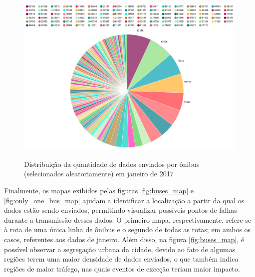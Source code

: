 \documentclass[
	12pt,				%
	oneside,			%
	a4paper,			%
	english,			%
	brazil				%
	]{abntex2ppgsi}
\begin{document}
\begin{figure}[!htb]%
	\centering
 	  \caption{Distribuição da quantidade de dados enviados por ônibus (selecionados aleatoriamente) em janeiro de 2017}
		\includegraphics[width=1\linewidth]{images/pizza_bus.png}
	\label{fig:pizza_bus}
\end{figure}

Finalmente, os mapas exibidos pelas figuras \ref {fig:buses_map} e \ref{fig:only_one_bus_map} ajudam a identificar a localização a partir da qual os dados estão sendo enviados, permitindo visualizar possíveis pontos de falhas durante a transmissão desses dados. O primeiro mapa, respectivamente, refere-se à rota de uma única linha de ônibus e o segundo de todas as rotas; em ambos os casos, referentes aos dados de janeiro. Além disso, na figura \ref {fig:buses_map}, é possível observar a segregação urbana da cidade, devido ao fato de algumas regiões terem uma maior densidade de dados enviados, o que também indica regiões de maior tráfego, nas quais eventos de exceção teriam maior impacto.
\end{document}
